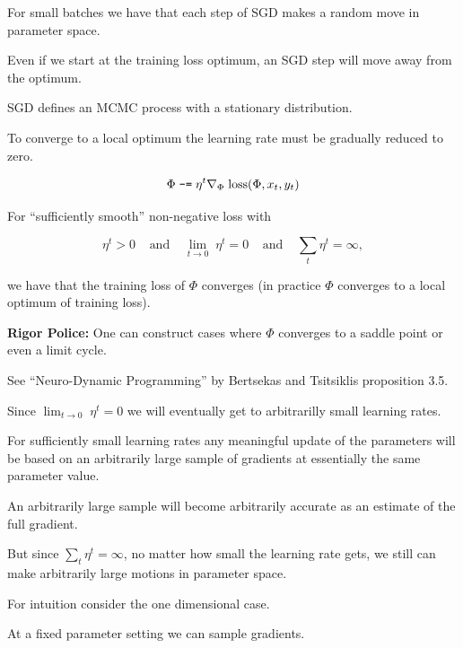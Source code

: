 {

For small batches we have that each step of SGD makes a random move in parameter space.

\vfill
Even if we start at the training loss optimum, an SGD step will move away from the optimum.

\vfill
SGD defines an MCMC process with a stationary distribution.

\vfill
To converge to a local optimum the learning rate must be gradually reduced to zero.



$$\Phi \;\mbox{\tt -=} \; \eta^t \nabla_\Phi\;\mathrm{loss}(\Phi,x_t,y_t)$$

\vfill
For ``sufficiently smooth'' non-negative loss with

\vfill
$$\eta^t > 0\;\;\;\;\mbox{and}\;\;\;\;\lim_{t \rightarrow 0} \;\eta^t = 0\;\;\;\;\mbox{and}\;\;\;\;\sum_t \eta^t = \infty,$$

\vfill
we have that the training loss of $\Phi$ converges (in practice $\Phi$ converges to a local optimum of training loss).

\vfill
{\Large {\bf Rigor Police:} One can construct cases where $\Phi$ converges to a saddle point or even a limit cycle.}

\vfill
{\Large See ``Neuro-Dynamic Programming'' by Bertsekas and Tsitsiklis proposition 3.5.}


Since $\lim_{t \rightarrow 0} \;\eta^t = 0$ we will eventually get to arbitrarilly small learning rates.

\vfill
For sufficiently small learning rates any meaningful update of the parameters will be based on an arbitrarily large sample
of gradients at essentially the same parameter value.

\vfill
An arbitrarily large sample will become arbitrarily accurate as an estimate of the full gradient.

\vfill
But since $\sum_t \eta^t = \infty$, no matter how small the learning rate gets, we still can make arbitrarily large motions in parameter space.


For intuition consider the one dimensional case.

\vfill
At a fixed parameter setting we can sample gradients.

}
